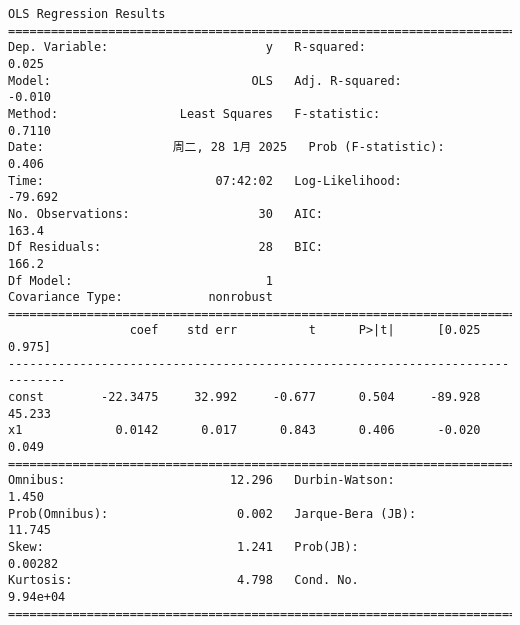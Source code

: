 \documentclass[11pt]{article}
\begin{document}
    \begin{Verbatim}[commandchars=\\\{\}]
                            OLS Regression Results
==============================================================================
Dep. Variable:                      y   R-squared:                       0.025
Model:                            OLS   Adj. R-squared:                 -0.010
Method:                 Least Squares   F-statistic:                    0.7110
Date:                  周二, 28 1月 2025   Prob (F-statistic):              0.406
Time:                        07:42:02   Log-Likelihood:                -79.692
No. Observations:                  30   AIC:                             163.4
Df Residuals:                      28   BIC:                             166.2
Df Model:                           1
Covariance Type:            nonrobust
==============================================================================
                 coef    std err          t      P>|t|      [0.025      0.975]
------------------------------------------------------------------------------
const        -22.3475     32.992     -0.677      0.504     -89.928      45.233
x1             0.0142      0.017      0.843      0.406      -0.020       0.049
==============================================================================
Omnibus:                       12.296   Durbin-Watson:                   1.450
Prob(Omnibus):                  0.002   Jarque-Bera (JB):               11.745
Skew:                           1.241   Prob(JB):                      0.00282
Kurtosis:                       4.798   Cond. No.                     9.94e+04
==============================================================================


\end{Verbatim}
\end{document}
